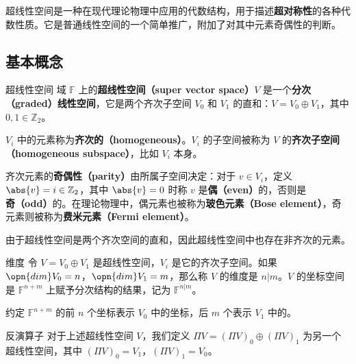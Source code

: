 


超线性空间是一种在现代理论物理中应用的代数结构，用于描述\textbf{超对称性}的各种代数性质。它是普通线性空间的一个简单推广，附加了对其中元素奇偶性的判断。

\subsection{基本概念}

\begin{definition}{超线性空间}
域 $\mathbb{F}$ 上的\textbf{超线性空间（super vector space）}$V$ 是一个\textbf{分次（graded）线性空间}，它是两个齐次子空间 $V_0$ 和 $V_1$ 的直和：$V=V_0\oplus V_1$，其中 $0, 1\in \mathbb{Z}_2$。
\end{definition}


$V_i$ 中的元素称为\textbf{齐次的（homogeneous）}。$V_i$ 的子空间被称为 $V$ 的\textbf{齐次子空间（homogeneous subspace）}，比如 $V_i$ 本身。

齐次元素的\textbf{奇偶性（parity）}由所属子空间决定：对于 $v\in V_i$，定义 $\abs{v}=i\in\mathbb{Z}_2$，其中 $\abs{v}=0$ 时称 $v$ 是\textbf{偶（even）}的，否则是\textbf{奇（odd）}的。在理论物理中，偶元素也被称为\textbf{玻色元素（Bose element）}，奇元素则被称为\textbf{费米元素（Fermi element）}。

由于超线性空间是两个齐次空间的直和，因此超线性空间中也存在非齐次的元素。

\begin{definition}{维度}
令 $V=V_0\oplus V_1$ 是超线性空间，$V_i$ 是它的齐次子空间。如果 $\opn{dim}V_0=n$，$\opn{dim}V_1=m$，那么称 $V$ 的维度是 $n|m$。$V$ 的坐标空间是 $\mathbb{F}^{n+m}$ 上赋予分次结构的结果，记为 $\mathbb{F}^{n|m}$。

约定 $\mathbb{F}^{n+m}$ 的前 $n$ 个坐标表示 $V_0$ 中的坐标，后 $m$ 个表示 $V_1$ 中的。
\end{definition}

\begin{definition}{反演算子}
对于上述超线性空间 $V$，我们定义 $\Pi V=(\Pi V)_0\oplus(\Pi V)_1$ 为另一个超线性空间，其中 $(\Pi V)_0=V_1$，$(\Pi V)_1=V_0$。
\end{definition}


